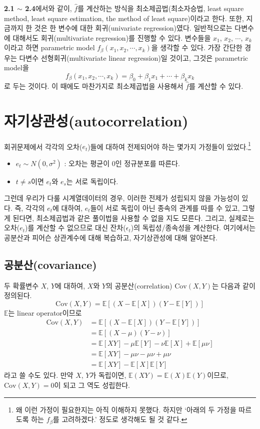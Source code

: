 \documentclass{article}
\begin{document}
\textbf{2.1 \(\sim\) 2.4}에서와 같이, \(\hat f\)를 계산하는 방식을 최소제곱법(최소자승법, least square method, least square estimation, the method of least square)이라고 한다.
또한, 지금까지 한 것은 한 변수에 대한 회귀(univariate regression)였다.
일반적으로는 다변수에 대해서도 회귀(multivariate regression)를 진행할 수 있다.
변수들을 \(x_1\), \(x_2\), \(\cdots\), \(x_k\)이라고 하면 parametric model \(f_\beta(x_1,x_2,\cdots,x_k)\)을 생각할 수 있다.
가장 간단한 경우는 다변수 선형회귀(multivariate linear regression)일 것이고, 그것은 parametric model을
\[f_\beta(x_1,x_2,\cdots,x_k)=\beta_0+\beta_1x_1+\cdots+\beta_kx_k\]
로 두는 것이다.
이 때에도 마찬가지로 최소제곱법을 사용해서 \(\hat f\)를 계산할 수 있다.

\section{자기상관성(autocorrelation)}
회귀문제에서 각각의 오차(\(e_t\))들에 대하여 전제되어야 하는 몇가지 가정들이 있었다.\footnote{왜 이런 가정이 필요한지는 아직 이해하지 못했다.
하지만 `아래의 두 가정을 따르도록 하는 \(f_\beta\)를 고려하겠다.' 정도로 생각해도 될 것 같다.}
\begin{itemize}
\item
\(e_t\sim N(0,\sigma^2)\) : 오차는 평균이 0인 정규분포를 따른다.
\item
\(t\neq s\)이면 \(e_t\)와 \(e_s\)는 서로 독립이다.
\end{itemize}
그런데 우리가 다룰 시계열데이터의 경우, 이러한 전제가 성립되지 않을 가능성이 있다.
즉, 각각의 \(e_t\)에 대하여, \(e_t\)들이 서로 독립이 아닌 종속의 관계를 따를 수 있고, 그렇게 된다면, 최소제곱법과 같은 풀이법을 사용할 수 없을 지도 모른다.
그리고, 실제로는 오차(\(e_t\))를 계산할 수 없으므로 대신 잔차(\(\epsilon_t\))의 독립성/종속성을 계산한다.
여기에서는 공분산과 피어슨 상관계수에 대해 복습하고, 자기상관성에 대해 알아본다.

\subsection{공분산(covariance)}
두 확률변수 \(X\), \(Y\)에 대하여, \(X\)와 \(Y\)의 공분산(correlation) \(\text{Cov}(X,Y)\)는  다음과 같이 정의된다.
\begin{equation}
\text{Cov}(X,Y)=\mathbb E[(X-\mathbb E[X])(Y-\mathbb E[Y])]
\end{equation}
\(\mathbb E\)는 linear operator이므로
\begin{align*}
\text{Cov}(X,Y)
&=\mathbb E[(X-\mathbb E[X])(Y-\mathbb E[Y])]\\
&=\mathbb E[(X-\mu)(Y-\nu)]\\
&=\mathbb E[XY]-\mu\mathbb E[Y]-\nu\mathbb E[X]+\mathbb E[\mu\nu]\\
&=\mathbb E[XY]-\mu\nu-\mu\nu+\mu\nu\\
&=\mathbb E[XY]-\mathbb E[X]\mathbb E[Y]
\end{align*}
라고 쓸 수도 있다.
만약 \(X\), \(Y\)가 독립이면, \(\mathbb E(XY)=\mathbb E(X)\mathbb E(Y)\)이므로, \(\text{Cov}(X,Y)=0\)이 되고 그 역도 성립한다.
\end{document}
